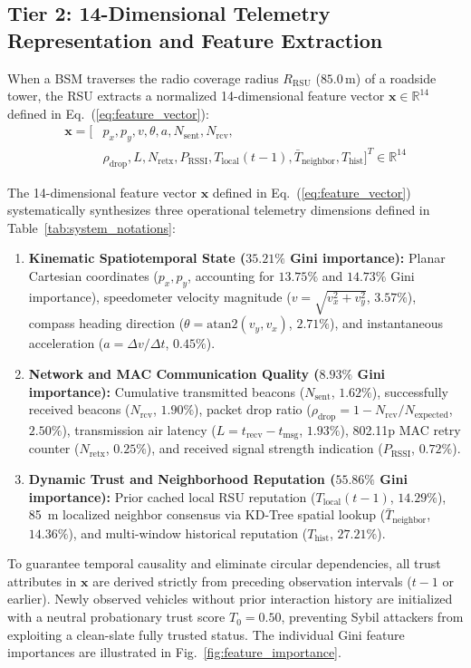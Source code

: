 \documentclass[conference]{IEEEtran}
\begin{document}
\subsection{Tier 2: 14-Dimensional Telemetry Representation and Feature Extraction}
\label{sec:feature_extraction}

When a BSM traverses the radio coverage radius $R_{\text{RSU}}$ ($85.0\,\text{m}$) of a roadside tower, the RSU extracts a normalized 14-dimensional feature vector $\mathbf{x} \in \mathbb{R}^{14}$ defined in Eq.~(\ref{eq:feature_vector}):
\begin{equation}
\begin{split}
\mathbf{x} = [ & p_x, p_y, v, \theta, a, N_{\text{sent}}, N_{\text{rcv}}, \\
& \rho_{\text{drop}}, L, N_{\text{retx}}, P_{\text{RSSI}}, T_{\text{local}}(t-1), \bar{T}_{\text{neighbor}}, T_{\text{hist}} ]^T \in \mathbb{R}^{14}
\end{split}
\label{eq:feature_vector}
\end{equation}

The 14-dimensional feature vector $\mathbf{x}$ defined in Eq.~(\ref{eq:feature_vector}) systematically synthesizes three operational telemetry dimensions defined in Table~\ref{tab:system_notations}:
\begin{enumerate}
    \item \textbf{Kinematic Spatiotemporal State ($35.21\%$ Gini importance):} Planar Cartesian coordinates ($p_x, p_y$, accounting for $13.75\%$ and $14.73\%$ Gini importance), speedometer velocity magnitude ($v = \sqrt{v_x^2 + v_y^2}$, $3.57\%$), compass heading direction ($\theta = \text{atan2}(v_y, v_x)$, $2.71\%$), and instantaneous acceleration ($a = \Delta v / \Delta t$, $0.45\%$).
    \item \textbf{Network and MAC Communication Quality ($8.93\%$ Gini importance):} Cumulative transmitted beacons ($N_{\text{sent}}$, $1.62\%$), successfully received beacons ($N_{\text{rcv}}$, $1.90\%$), packet drop ratio ($\rho_{\text{drop}} = 1 - N_{\text{rcv}} / N_{\text{expected}}$, $2.50\%$), transmission air latency ($L = t_{\text{recv}} - t_{\text{msg}}$, $1.93\%$), 802.11p MAC retry counter ($N_{\text{retx}}$, $0.25\%$), and received signal strength indication ($P_{\text{RSSI}}$, $0.72\%$).
    \item \textbf{Dynamic Trust and Neighborhood Reputation ($55.86\%$ Gini importance):} Prior cached local RSU reputation ($T_{\text{local}}(t-1)$, $14.29\%$), 85~m localized neighbor consensus via KD-Tree spatial lookup ($\bar{T}_{\text{neighbor}}$, $14.36\%$), and multi-window historical reputation ($T_{\text{hist}}$, $27.21\%$).
\end{enumerate}
To guarantee temporal causality and eliminate circular dependencies, all trust attributes in $\mathbf{x}$ are derived strictly from preceding observation intervals ($t-1$ or earlier). Newly observed vehicles without prior interaction history are initialized with a neutral probationary trust score $T_0 = 0.50$, preventing Sybil attackers from exploiting a clean-slate fully trusted status. The individual Gini feature importances are illustrated in Fig.~\ref{fig:feature_importance}.
\end{document}
